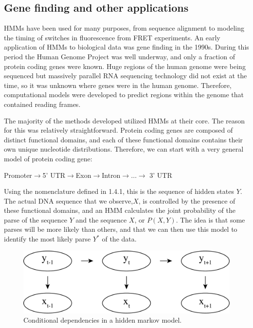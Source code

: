 \subsection{Gene finding and other applications}
HMMs have been used for many purposes, from sequence alignment to modeling the timing of switches in fluorescence from FRET experiments. An early application of HMMs to biological data was gene finding in the 1990s. During this period the Human Genome Project was well underway, and only a fraction of protein coding genes were known. Huge regions of the human genome were being sequenced but massively parallel RNA sequencing technology did not exist at the time, so it was unknown where genes were in the human genome. Therefore, computational models were developed to predict regions within the genome that contained reading frames. 

The majority of the methods developed utilized HMMs at their core. The reason for this was relatively straightforward. Protein coding genes are composed of distinct functional domains, and each of these functional domains contains their own unique nucleotide distributions. Therefore, we can start with a very general model of protein coding gene:

\begin{center}
    Promoter$\rightarrow$5' UTR$\rightarrow$Exon$\rightarrow$Intron$\rightarrow \dots \rightarrow$ 3' UTR
\end{center}

Using the nomenclature defined in 1.4.1, this is the sequence of hidden states $Y$. The actual DNA sequence that we observe,$X$, is controlled by the presence of these functional domains, and an HMM calculates the joint probability of the parse of the sequence $Y$ and the sequence $X$, or $P(X,Y)$. The idea is that some parses will be more likely than others, and that we can then use this model to identify the most likely parse $Y^*$ of the data. 
\begin{figure}[h]
\centering
\includegraphics[width=\textwidth]{images/hmm.pdf}
\caption{Conditional dependencies in a hidden markov model.}
\label{fig:HMM}
\end{figure}
